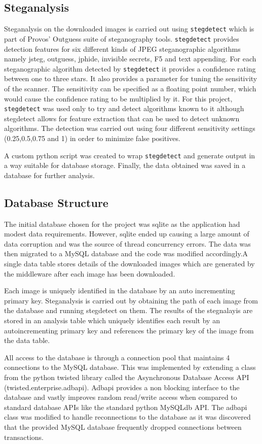 \subsection {Steganalysis}
\label{sec:stegtool}
Steganalysis on the downloaded images is carried out using \texttt{stegdetect} which is part of Provos' Outguess suite of steganography tools. \texttt{stegdetect} provides detection features for six different kinds of JPEG steganographic algorithms namely jsteg, outguess, jphide, invisible secrets, F5 and text appending. For each steganographic algorithm detected by \texttt{stegdetect} it provides a confidence rating between one to three stars. It also provides a parameter for tuning the sensitivity of the scanner. The sensitivity can be specified as a floating point number, which would cause the confidence rating to be multiplied by it. For this project, \texttt{stegdetect} was used only to try and detect algorithms known to it although stegdetect allows for feature extraction that can be used to detect unknown algorithms. The detection was carried out using four different sensitivity settings (0.25,0.5,0.75 and 1) in order to minimize false positives.
\par A custom python script was created to wrap \texttt{stegdetect} and generate output in a way suitable for database storage. Finally, the data obtained was saved in a database for further analysis.
\subsection{Database Structure}
\label{sec:dbstructure}
The initial database chosen for the project was sqlite as the application had modest data requirements. However, sqlite ended up causing a large amount of data corruption and was the source of thread concurrency errors. The data was then migrated to a MySQL database and the code was modified accordingly.A single data table stores details of the downloaded images which are generated by the middleware after each image has been downloaded. 
\par Each image is uniquely identified in the database by an auto incrementing primary key. Steganalysis is carried out by obtaining the path of each image from the database and running stegdetect on them. The results of the stegnalayis are stored in an analysis table which uniquely identifies each result by an autoincrementing primary key and references the primary key of the image from the data table.
\par  All access to the database is through a connection pool that maintains 4 connections to the MySQL database. This was implemented by extending a class from the python twisted library called the Asynchronous Database Access API (twisted.enterprise.adbapi). Adbapi provides a non blocking interface to the database and vastly improves random read/write access when compared to standard database APIs like the standard python MySQLdb API. The adbapi class was modified to handle reconnections to the database as it was discovered that the provided MySQL database frequently dropped connections between transactions. 
